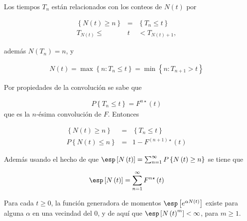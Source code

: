 %
%

Los tiempos $T_{n}$ est\'an relacionados con los conteos de $N\left(t\right)$ por

\begin{eqnarray*}
\left\{N\left(t\right)\geq n\right\}&=&\left\{T_{n}\leq t\right\}\\
T_{N\left(t\right)}\leq &t&<T_{N\left(t\right)+1},
\end{eqnarray*}

adem\'as $N\left(T_{n}\right)=n$, y 

\begin{eqnarray*}
N\left(t\right)=\max\left\{n:T_{n}\leq t\right\}=\min\left\{n:T_{n+1}>t\right\}
\end{eqnarray*}

Por propiedades de la convoluci\'on se sabe que

\begin{eqnarray*}
P\left\{T_{n}\leq t\right\}=F^{n\star}\left(t\right)
\end{eqnarray*}
que es la $n$-\'esima convoluci\'on de $F$. Entonces 

\begin{eqnarray*}
\left\{N\left(t\right)\geq n\right\}&=&\left\{T_{n}\leq t\right\}\\
P\left\{N\left(t\right)\leq n\right\}&=&1-F^{\left(n+1\right)\star}\left(t\right)
\end{eqnarray*}

Adem\'as usando el hecho de que $\esp\left[N\left(t\right)\right]=\sum_{n=1}^{\infty}P\left\{N\left(t\right)\geq n\right\}$
se tiene que

\begin{eqnarray*}
\esp\left[N\left(t\right)\right]=\sum_{n=1}^{\infty}F^{n\star}\left(t\right)
\end{eqnarray*}

\begin{Prop}
Para cada $t\geq0$, la funci\'on generadora de momentos $\esp\left[e^{\alpha N\left(t\right)}\right]$ existe para alguna $\alpha$ en una vecindad del 0, y de aqu\'i que $\esp\left[N\left(t\right)^{m}\right]<\infty$, para $m\geq1$.
\end{Prop}


